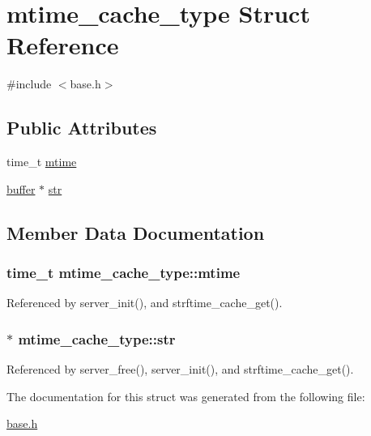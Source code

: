 \hypertarget{structmtime__cache__type}{\section{mtime\-\_\-cache\-\_\-type Struct Reference}
\label{structmtime__cache__type}
}


{\ttfamily \#include $<$base.\-h$>$}

\subsection*{Public Attributes}
\begin{DoxyCompactItemize}
\item 
time\-\_\-t \hyperlink{structmtime__cache__type_a041c30e8fb585f6c6924fe0168b18023}{mtime}
\item 
\hyperlink{structbuffer}{buffer} $\ast$ \hyperlink{structmtime__cache__type_a455860e621a01d47ea3efa3ec5b5fa13}{str}
\end{DoxyCompactItemize}


\subsection{Member Data Documentation}
\hypertarget{structmtime__cache__type_a041c30e8fb585f6c6924fe0168b18023}{
\subsubsection[{mtime}]{\setlength{\rightskip}{0pt plus 5cm}time\-\_\-t mtime\-\_\-cache\-\_\-type\-::mtime}}\label{structmtime__cache__type_a041c30e8fb585f6c6924fe0168b18023}


Referenced by server\-\_\-init(), and strftime\-\_\-cache\-\_\-get().

\hypertarget{structmtime__cache__type_a455860e621a01d47ea3efa3ec5b5fa13}{
\subsubsection[{str}]{$\ast$ mtime\-\_\-cache\-\_\-type\-::str}}\label{structmtime__cache__type_a455860e621a01d47ea3efa3ec5b5fa13}


Referenced by server\-\_\-free(), server\-\_\-init(), and strftime\-\_\-cache\-\_\-get().



The documentation for this struct was generated from the following file\-:\begin{DoxyCompactItemize}
\item 
\hyperlink{base_8h}{base.\-h}\end{DoxyCompactItemize}
